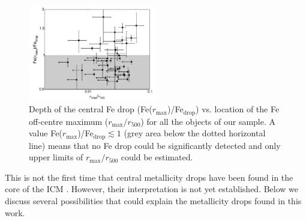 \documentclass{aa}
\begin{document}
\begin{figure}[!]

                \includegraphics[width=0.5\textwidth]{fig_Fe_drop_correlations.pdf}

        \caption{Depth of the central Fe drop (Fe($r_\text{max}$)/Fe$_\text{drop}$) vs. location of the Fe off-centre maximum ($r_\text{max}/r_{500}$) for all the objects of our sample. A value Fe($r_\text{max}$)/Fe$_\text{drop} \lesssim 1$ (grey area below the dotted horizontal line) means that no Fe drop could be significantly detected and only upper limits of $r_\text{max}/r_{500}$ could be estimated.}
\label{fig:Fe_drop_correlations}
\end{figure}


This is not the first time that central metallicity drops have been found in the core of the ICM \citep[e.g.][]{2002MNRAS.331..273S,2002MNRAS.336..299J,2007MNRAS.381.1381S,2013MNRAS.428...58R}. However, their interpretation is not yet established. Below we discuss several possibilities that could explain the metallicity drops found in this work.
\end{document}
